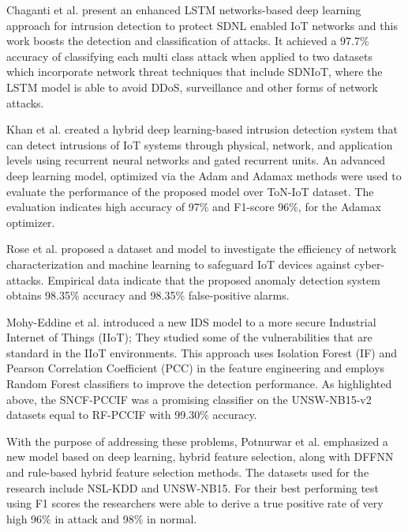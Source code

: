 Chaganti et al. \cite{chaganti2023deep} present an enhanced LSTM networks-based deep learning approach for intrusion detection to protect SDNL enabled IoT networks and this work boosts the detection and classification of attacks. It achieved a 97.7\% accuracy of classifying each multi class attack when applied to two datasets which incorporate network threat techniques that include SDNIoT, where the LSTM model is able to avoid DDoS, surveillance and other forms of network attacks.

Khan et al. \cite{khan2023hybrid} created a hybrid deep learning-based intrusion detection system that can detect intrusions of IoT systems through physical, network, and application levels using recurrent neural networks and gated recurrent units. An advanced deep learning model, optimized via the Adam and Adamax methods were used to evaluate the performance of the proposed model over ToN-IoT dataset.  The evaluation indicates high accuracy of 97\% and F1-score 96\%, for the Adamax optimizer.

Rose et al. \cite{rose2021intrusion} proposed a dataset and model to investigate the efficiency of network characterization and machine learning to safeguard IoT devices against cyber-attacks. Empirical data indicate that the proposed anomaly detection system obtains 98.35\% accuracy and 98.35\% false-positive alarms.

Mohy-Eddine et al. \cite{mohy-eddine2022ensemble} introduced a new IDS model to a more secure Industrial Internet of Things (IIoT); They studied some of the vulnerabilities that are standard in the IIoT environments. This approach uses Isolation Forest (IF) and Pearson Correlation Coefficient (PCC) in the feature engineering and employs Random Forest classifiers to improve the detection performance. As highlighted above, the SNCF-PCCIF was a promising classifier on the UNSW-NB15-v2 datasets equal to RF-PCCIF with 99.30\% accuracy.


With the purpose of addressing these problems, Potnurwar et al. \cite{potnurwar2023deep} emphasized a new model based on deep learning, hybrid feature selection, along with DFFNN and rule-based hybrid feature selection methods. The datasets used for the research include NSL-KDD and UNSW-NB15. For their best performing test using F1 scores the researchers were able to derive a true positive rate of very high 96\% in attack and 98\% in normal.